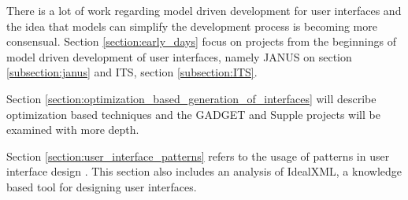 There is a lot of work regarding model driven development for user interfaces and the idea that models can simplify the development process is becoming more consensual. Section \ref{section:early_days} focus on projects from the beginnings of model driven development of user interfaces, namely JANUS on section \ref{subsection:janus} and ITS, section \ref{subsection:ITS}.

Section \ref{section:optimization_based_generation_of_interfaces} will describe optimization based techniques and the GADGET and Supple projects will be examined with more depth.

Section \ref{section:user_interface_patterns} refers to the usage of patterns in user interface design . This section also includes an analysis of IdealXML, a knowledge based tool for designing user interfaces.




